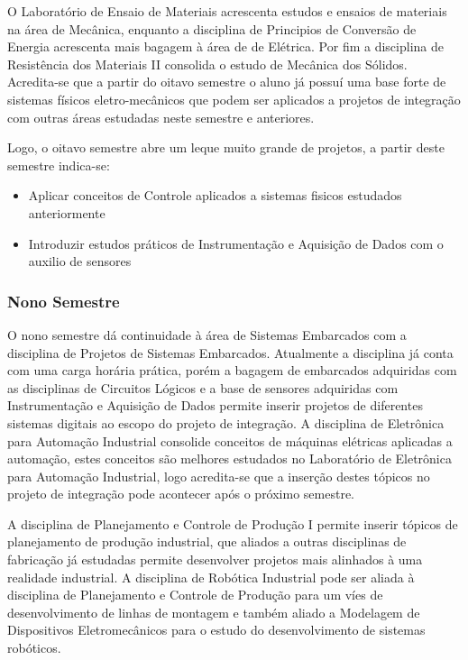 \documentclass[12pt]{article} %
\begin{document}
O Laboratório de Ensaio de Materiais acrescenta estudos e ensaios de materiais na área de Mecânica, enquanto a disciplina de Principios de Conversão de Energia acrescenta mais bagagem à área de de Elétrica. Por fim a disciplina de Resistência dos Materiais II consolida o estudo de Mecânica dos Sólidos. Acredita-se que a partir do oitavo semestre o aluno já possuí uma base forte de sistemas físicos eletro-mecânicos que podem ser aplicados a projetos de integração com outras áreas estudadas neste semestre e anteriores.

Logo, o oitavo semestre abre um leque muito grande de projetos, a partir deste semestre indica-se:

\begin{itemize}
\item Aplicar conceitos de Controle aplicados a sistemas fisicos estudados anteriormente
\item Introduzir estudos práticos de Instrumentação e Aquisição de Dados com o auxilio de sensores
\end{itemize}

\subsubsection{Nono Semestre}

O nono semestre dá continuidade à área de Sistemas Embarcados com a disciplina de Projetos de Sistemas Embarcados. Atualmente a disciplina já conta com uma carga horária prática, porém a bagagem de embarcados adquiridas com as disciplinas de Circuitos Lógicos e a base de sensores adquiridas com Instrumentação e Aquisição de Dados permite inserir projetos de diferentes sistemas digitais ao escopo do projeto de integração.
A disciplina de Eletrônica para Automação Industrial consolide conceitos de máquinas elétricas aplicadas a automação, estes conceitos são melhores estudados no Laboratório de Eletrônica para Automação Industrial, logo acredita-se que a inserção destes tópicos no projeto de integração pode acontecer após o próximo semestre.

A disciplina de Planejamento e Controle de Produção I permite inserir tópicos de planejamento de produção industrial, que aliados a outras disciplinas de fabricação já estudadas permite desenvolver projetos mais alinhados à uma realidade industrial.
A disciplina de Robótica Industrial pode ser aliada à disciplina de Planejamento e Controle de Produção para um víes de desenvolvimento de linhas de montagem e também aliado a Modelagem de Dispositivos Eletromecânicos para o estudo do desenvolvimento de sistemas robóticos.
\end{document}
